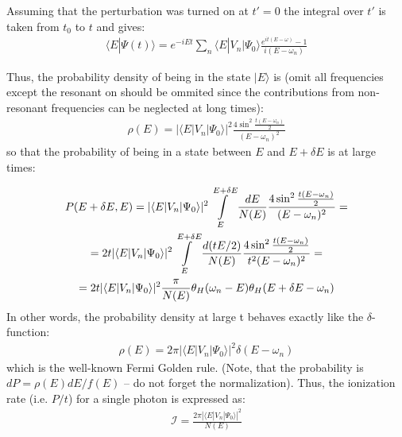 Assuming that the perturbation was turned on at $ t'=0 $ the integral over $ t' $ is taken from $ t_{0} $ to $ t $ and gives:
\begin{gather}
	\langle E|\Psi(t)\rangle=e^{-iEt}\sum_{n}\langle E|V_{n}|\Psi_{0}\rangle\frac{e^{it(E-\omega)}-1}{i(E-\omega_{n})}
\end{gather}

Thus, the probability density of being in the state $ |E\rangle $ is (omit all frequencies except the resonant on should be ommited since the contributions from non-resonant frequencies can be neglected at long times):
\begin{gather}
	\rho(E)=|\langle E|V_{n}|\Psi_{0}\rangle|^{2}\frac{4\sin^{2}\frac{t(E-\omega_{n})}{2}}{(E-\omega_{n})^{2}}
\end{gather}
so that the probability of being in a state between $ E $ and $ E+\delta E $ is at large times:

\begin{multline}
	P(E+\delta E,E)=|\langle E|V_{n}|\Psi_{0}\rangle|^{2}\intop_{E}^{E+\delta E}\frac{dE}{N(E)}\frac{4\sin^{2}\frac{t(E-\omega_{n})}{2}}{(E-\omega_{n})^{2}}=\\=2t|\langle E|V_{n}|\Psi_{0}\rangle|^{2}\intop_{E}^{E+\delta E}\frac{d(tE/2)}{N(E)}\frac{4\sin^{2}\frac{t(E-\omega_{n})}{2}}{t^{2}(E-\omega_{n})^{2}}=\\=2t|\langle E|V_{n}|\Psi_{0}\rangle|^{2}\frac{\pi}{N(E)}\theta_{H}(\omega_{n}-E)\theta_{H}(E+\delta E-\omega_{n})
\end{multline}
In other words, the probability density at large t behaves exactly like the $ \delta $-function:
\begin{gather}
	\rho(E)=2\pi|\langle E|V_{n}|\Psi_{0}\rangle|^{2}\delta(E-\omega_{n})
\end{gather} 
which is the well-known Fermi Golden rule. (Note, that the probability is $ dP=\rho(E)dE/f(E) $ – do not forget the normalization). Thus, the ionization rate (i.e. $ P/t $) for a single photon is expressed as:
\begin{gather}
\label{golden_reul_first_order}
	\mathcal{I}=\frac{2\pi|\langle E|V_{n}|\Psi_{0}\rangle|^{2}}{N(E)}
\end{gather}
